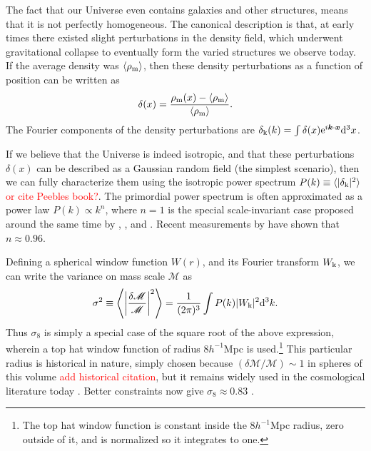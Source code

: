 The fact that our Universe even contains galaxies and other structures, means that it is not perfectly homogeneous. The canonical description is that, at early times there existed slight perturbations in the density field, which underwent gravitational collapse to eventually form the varied structures we observe today. If the average density was $\langle \rho_{\rm m} \rangle$, then these density perturbations as a function of position can be written as
\begin{equation}
\delta(x) = \frac{\rho_{\rm m}(x) - \langle \rho_{\rm m} \rangle}{\langle \rho_{\rm m} \rangle}.
\end{equation}
The Fourier components of the density perturbations are $\delta_{\rm k}(k) = \int \delta(x) {\rm e}^{i {\bm k} \cdot {\bm x}}{\rm d}^3x$. 

If we believe that the Universe is indeed isotropic, and that these perturbations $\delta(x)$ can be described as a Gaussian random field (the simplest scenario), then we can fully characterize them using the isotropic power spectrum $P(k) \equiv \langle | \delta_{\rm k} |^2 \rangle$ \citep{Kravtsov12} \textcolor{red}{or cite Peebles book?}. The primordial power spectrum is often approximated as a power law $P(k) \propto k^n$, where $n=1$ is the special scale-invariant case proposed around the same time by \citet{Harrison70}, \citet{PeeblesYu70}, and \citet{Zeldovich72}. Recent measurements by \citet{PlanckXVI} have shown that $n \approx 0.96$.

Defining a spherical window function $W(r)$, and its Fourier transform $W_{\rm k}$, we can write the variance on mass scale ${\mathscr M}$ as 
\begin{equation}
\sigma^2 \equiv \left\langle \left| \frac{\delta {\mathscr M}}{\mathscr M} \right|^2 \right\rangle = \frac{1}{(2\pi)^3} \int P(k) |W_{\rm k}|^2 {\rm d}^3k.
\end{equation}
Thus $\sigma_8$ is simply a special case of the square root of the above expression, wherein a top hat window function of radius $8 h^{-1}$Mpc is used.\footnote{The top hat window function is constant inside the $8 h^{-1}$Mpc radius, zero outside of it, and is normalized so it integrates to one.} This particular radius is historical in nature, simply chosen because $(\delta {\mathscr M}/{\mathscr M}) \sim 1$ in spheres of this volume \textcolor{red}{add historical citation}, but it remains widely used in the cosmological literature today \citep{Voit05}. Better constraints now give $\sigma_8 \approx 0.83$ \citep{PlanckXVI}.

